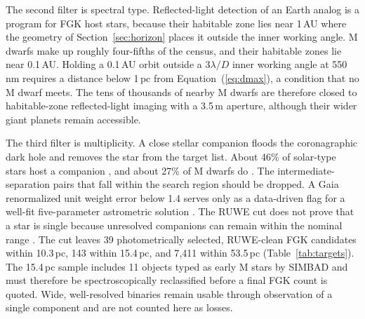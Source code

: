 The second filter is spectral type. Reflected-light detection of an
Earth analog is a program for FGK host stars, because their habitable
zone lies near 1\,AU where the geometry of Section~\ref{sec:horizon}
places it outside the inner working angle. M dwarfs make up roughly
four-fifths of the census, and their habitable zones lie near 0.1\,AU.
Holding a 0.1\,AU orbit outside a $3\lambda/D$ inner working angle at
550\,nm requires a distance below 1\,pc from
Equation~(\ref{eq:dmax}), a condition that no M dwarf meets. The tens
of thousands of nearby M dwarfs are therefore closed to habitable-zone
reflected-light imaging with a 3.5\,m aperture, although their wider
giant planets remain accessible.

The third filter is multiplicity. A close stellar companion floods the
coronagraphic dark hole and removes the star from the target list.
About 46\% of solar-type stars host a companion \cite{raghavan10}, and
about 27\% of M dwarfs do \cite{winters19}. The intermediate-separation
pairs that fall within the search region should be dropped. A Gaia
renormalized unit weight error below 1.4 serves only as a data-driven flag
for a well-fit five-parameter astrometric solution \cite{lindegren21}.
The RUWE cut does not prove that a star is single because unresolved
companions can remain within the nominal range \cite{stassun21}. The cut leaves 39 photometrically
selected, RUWE-clean FGK candidates within 10.3\,pc, 143 within
15.4\,pc, and 7{,}411 within 53.5\,pc (Table~\ref{tab:targets}). The
15.4\,pc sample includes 11 objects typed as early M stars by SIMBAD and
must therefore be spectroscopically reclassified before a final FGK count
is quoted. Wide, well-resolved
binaries remain usable through observation of a single component and
are not counted here as losses.

